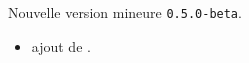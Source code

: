 Nouvelle version mineure \verb+0.5.0-beta+.

\begin{itemize}[itemsep=.5em]
    \item {}
          ajout de .

    \separation
\end{itemize}